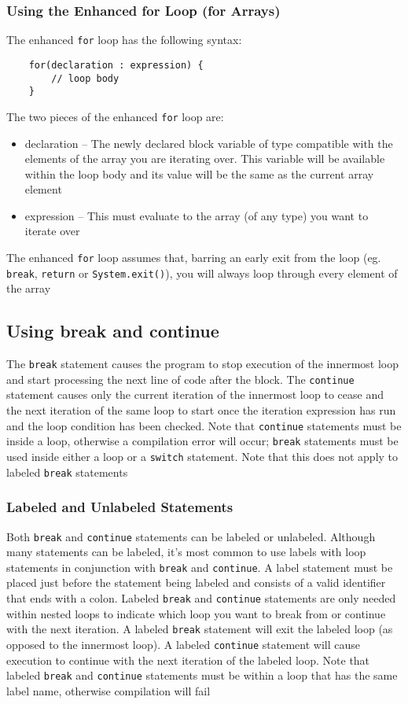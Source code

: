 \subsubsection{Using the Enhanced for Loop (for Arrays)}
The enhanced \verb#for# loop has the following syntax:
\begin{verbatim}
    for(declaration : expression) {
        // loop body
    }
\end{verbatim}
The two pieces of the enhanced \verb#for# loop are:
\begin{itemize}
    \item declaration -- The newly declared block variable of type compatible 
    with the elements of the array you are iterating over. This variable will 
    be available within the loop body and its value will be the same as the 
    current array element
    \item expression -- This must evaluate to the array (of any type) you want 
    to iterate over
\end{itemize}
The enhanced \verb#for# loop assumes that, barring an early exit from the loop 
(eg. \verb#break#, \verb#return# or \verb#System.exit()#), you will always loop 
through every element of the array

\subsection{Using break and continue}
The \verb#break# statement causes the program to stop execution of the 
innermost loop and start processing the next line of code after the block. The 
\verb#continue# statement causes only the current iteration of the innermost 
loop to cease and the next iteration of the same loop to start once the 
iteration expression has run and the loop condition has been checked. Note that 
\verb#continue# statements must be inside a loop, otherwise a compilation error 
will occur; \verb#break# statements must be used inside either a loop or a 
\verb#switch# statement. Note that this does not apply to labeled \verb#break# 
statements

\subsubsection{Labeled and Unlabeled Statements}
Both \verb#break# and \verb#continue# statements can be labeled or unlabeled.  
Although many statements can be labeled, it's most common to use labels with 
loop statements in conjunction with \verb#break# and \verb#continue#. A label 
statement must be placed just before the statement being labeled and consists 
of a valid identifier that ends with a colon. Labeled \verb#break# and 
\verb#continue# statements are only needed within nested loops to indicate 
which loop you want to break from or continue with the next iteration. A 
labeled \verb#break# statement will exit the labeled loop (as opposed to the 
innermost loop). A labeled \verb#continue# statement will cause execution to 
continue with the next iteration of the labeled loop. Note that labeled 
\verb#break# and \verb#continue# statements must be within a loop that has the 
same label name, otherwise compilation will fail

